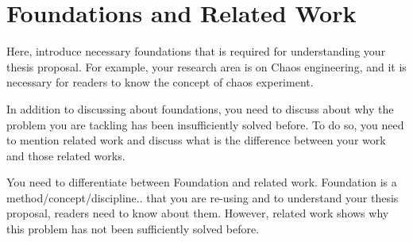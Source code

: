 
\chapter{Foundations and Related Work}

Here, introduce necessary foundations that is required for understanding your thesis proposal. For example, your research area is on Chaos engineering, and it is necessary for readers to know the concept of chaos experiment.

In addition to discussing about foundations, you need to discuss about why the problem you are tackling has been insufficiently solved before. To do so, you need to mention related work and discuss what is the difference between your work and those related works.

You need to differentiate between Foundation and related work. Foundation is a method/concept/discipline.. that you are re-using and to understand your thesis proposal, readers need to know about them. However, related work shows why this problem has not been sufficiently solved before.
